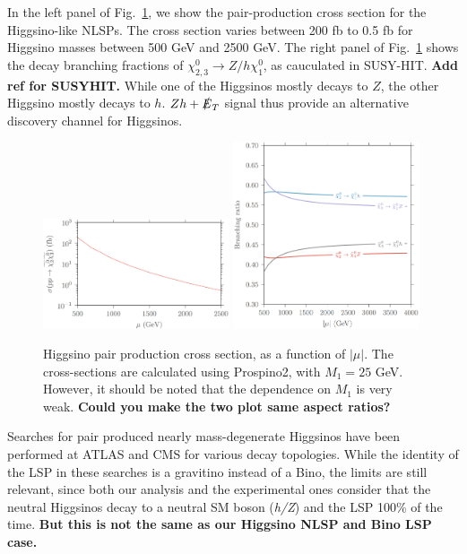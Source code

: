 \documentclass[a4paper,11pt]{article}
\newcommand{\Shufang}[1]{{\bf\color{Maroon}  #1}}
\newcommand{\met}{{\slashed{E}_T}}
\begin{document}
In the left panel of Fig.~\ref{fig:xsection_plot}, we show the pair-production cross section for the Higgsino-like NLSPs.  The cross section varies between 200 fb to 0.5 fb for Higgsino masses between 500 GeV and 2500 GeV. The right panel of Fig.~\ref{fig:xsection_plot} shows the decay branching fractions of $\chi_{2,3}^0\rightarrow Z/h \chi_1^0$, as cauculated in SUSY-HIT. \Shufang{Add ref for SUSYHIT.}  While one of the Higgsinos mostly decays to $Z$, the other Higgsino mostly decays to $h$.  $Zh+\met$ signal thus provide an alternative discovery channel for Higgsinos. 

\begin{figure}[h]
  \centering
  \includegraphics[width=0.49\textwidth]{images/higgsino_production_xsection.png}
  \includegraphics[width=0.49\textwidth]{images/higgsino_br_plot.png}
  \caption{Higgsino pair production cross section, as a function of $|\mu|$. The
  cross-sections are calculated using Prospino2, with $M_1 = 25$ GeV. However, it
  should be noted that the dependence on $M_1$ is very weak.  \Shufang{Could you make the two plot same aspect ratios?}}
  \label{fig:xsection_plot}
\end{figure}

 

Searches for pair produced nearly mass-degenerate Higgsinos  have been performed 
at ATLAS and CMS for various decay  topologies. While the identity of the 
LSP in these searches is a gravitino  instead of a Bino,   the limits are still  relevant, since both  our analysis  and the experimental ones consider that  
the neutral Higgsinos decay to a  neutral SM boson (\emph{h/Z})  and the 
LSP 100\% of the time.  \Shufang{But this is not the same as our Higgsino NLSP and Bino LSP case.}
\end{document}
